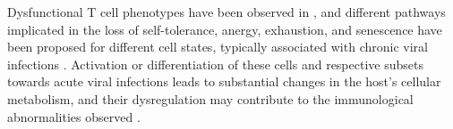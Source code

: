 Dysfunctional T cell phenotypes have been observed in \cfs, and different pathways implicated in the loss of self-tolerance, anergy, exhaustion, and senescence have been proposed for different cell states, typically associated with chronic viral infections \citep{maya2023SurveyingMetabolic}.
Activation or differentiation of these cells and respective subsets towards acute viral infections leads to substantial changes in the host's cellular metabolism, and their dysregulation may contribute to the immunological abnormalities observed \citep{bantug2018SpectrumCell}.
 
% 

